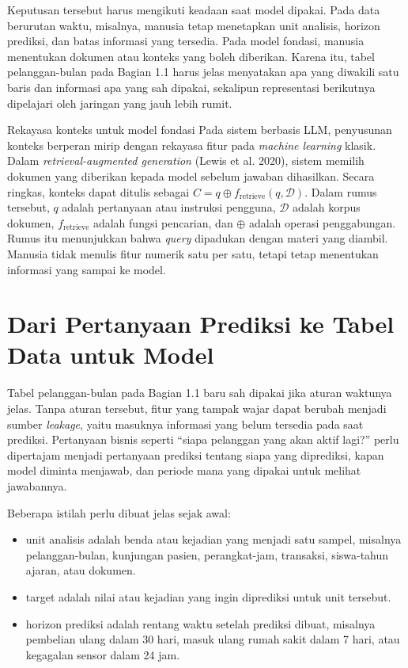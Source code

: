 Keputusan tersebut harus mengikuti keadaan saat model dipakai. Pada data berurutan waktu, misalnya, manusia tetap menetapkan unit analisis, horizon prediksi, dan batas informasi yang tersedia. Pada model fondasi, manusia menentukan dokumen atau konteks yang boleh diberikan. Karena itu, tabel pelanggan-bulan pada Bagian 1.1 harus jelas menyatakan apa yang diwakili satu baris dan informasi apa yang sah dipakai, sekalipun representasi berikutnya dipelajari oleh jaringan yang jauh lebih rumit.

\begin{pendalaman}{Rekayasa konteks untuk model fondasi}
Pada sistem berbasis LLM, penyusunan konteks berperan mirip dengan rekayasa fitur pada \emph{machine learning} klasik. Dalam \emph{retrieval-augmented generation} (Lewis et al. 2020), sistem memilih dokumen yang diberikan kepada model sebelum jawaban dihasilkan. Secara ringkas, konteks dapat ditulis sebagai \(C = q \oplus f_{\text{retrieve}}(q, \mathcal{D})\). Dalam rumus tersebut, \(q\) adalah pertanyaan atau instruksi pengguna, \(\mathcal{D}\) adalah korpus dokumen, \(f_{\text{retrieve}}\) adalah fungsi pencarian, dan \(\oplus\) adalah operasi penggabungan. Rumus itu menunjukkan bahwa \emph{query} dipadukan dengan materi yang diambil. Manusia tidak menulis fitur numerik satu per satu, tetapi tetap menentukan informasi yang sampai ke model.
\end{pendalaman}

\section{Dari Pertanyaan Prediksi ke Tabel Data untuk Model}\label{dari-pertanyaan-prediksi-ke-tabel-data-untuk-model}

Tabel pelanggan-bulan pada Bagian 1.1 baru sah dipakai jika aturan waktunya jelas. Tanpa aturan tersebut, fitur yang tampak wajar dapat berubah menjadi sumber \emph{leakage}, yaitu masuknya informasi yang belum tersedia pada saat prediksi. Pertanyaan bisnis seperti ``siapa pelanggan yang akan aktif lagi?'' perlu dipertajam menjadi pertanyaan prediksi tentang siapa yang diprediksi, kapan model diminta menjawab, dan periode mana yang dipakai untuk melihat jawabannya.

Beberapa istilah perlu dibuat jelas sejak awal:

\begin{itemize}
\tightlist
\item
  unit analisis adalah benda atau kejadian yang menjadi satu sampel, misalnya pelanggan-bulan, kunjungan pasien, perangkat-jam, transaksi, siswa-tahun ajaran, atau dokumen.
\item
  target adalah nilai atau kejadian yang ingin diprediksi untuk unit tersebut.
\item
  horizon prediksi adalah rentang waktu setelah prediksi dibuat, misalnya pembelian ulang dalam 30 hari, masuk ulang rumah sakit dalam 7 hari, atau kegagalan sensor dalam 24 jam.
\end{itemize}

